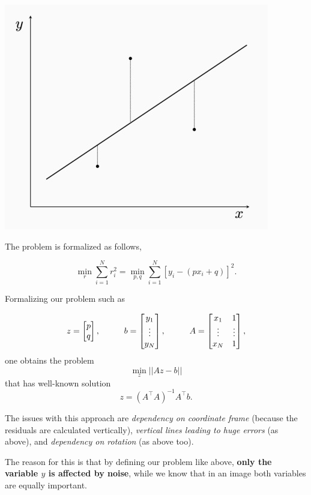 \documentclass[10pt]{report}
\begin{document}
\begin{center}
\includegraphics[scale=0.3]{./pics/fit/least-squares.jpg}
\end{center}

The problem is formalized as follows,

\[\min_{r} \sum_{i=1}^N r_i^2 = \min_{p, q} \sum_{i=1}^N [y_i - (px_i + q)]^2.\]

Formalizing our problem such as

\[z = \begin{bmatrix}p \\ q\end{bmatrix}, \hspace*{1cm} b = \begin{bmatrix}y_1\\ \vdots \\ y_N\end{bmatrix}, \hspace*{1cm} A = \begin{bmatrix} x_1 & 1 \\ \vdots & \vdots \\ x_N & 1\end{bmatrix},\]
one obtains the problem \[\min_z ||Az - b||\] that has well-known
solution \[z = (A^\top A)^{-1}A^\top b.\]

The issues with this approach are \emph{dependency on coordinate frame}
(because the residuals are calculated vertically), \emph{vertical lines
leading to huge errors} (as above), and \emph{dependency on rotation} (as
above too).

The reason for this is that by defining our problem like above, \textbf{only
the variable \(y\) is affected by noise}, while we know that in an image
both variables are equally important.
\end{document}
